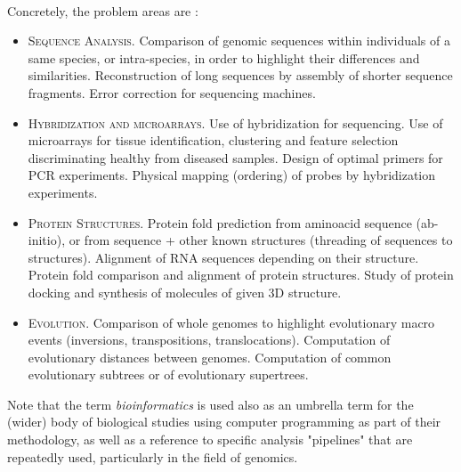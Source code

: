 \paragraph{}
Concretely, the problem areas are \cite{a1020100}:
\begin{itemize}
	\item \textsc{Sequence Analysis.} Comparison of genomic sequences within individuals of a same species, or intra-species, in order to highlight their differences and similarities. Reconstruction of long sequences by assembly of shorter sequence fragments. Error correction for sequencing machines.
	\item \textsc{Hybridization and microarrays.} Use of hybridization for sequencing. Use of microarrays for tissue identification, clustering and feature selection discriminating healthy from diseased samples. Design of optimal primers for PCR experiments. Physical mapping (ordering) of probes by hybridization experiments.
	\item \textsc{Protein Structures.} Protein fold prediction from aminoacid sequence (ab-initio), or from sequence + other known structures (threading of sequences to structures). Alignment of RNA sequences depending on their structure. Protein fold comparison and alignment of protein structures. Study of protein docking and synthesis of molecules of given 3D structure.
	\item \textsc{Evolution.} Comparison of whole genomes to highlight evolutionary macro events (inversions, transpositions, translocations). Computation of evolutionary distances between genomes. Computation of common evolutionary subtrees or of evolutionary supertrees.
\end{itemize}

Note that the term \textit{bioinformatics} is used also as an umbrella term for the (wider) body of biological studies using computer programming as part of their methodology, as well as a reference to specific analysis "pipelines" that are repeatedly used, particularly in the field of genomics.